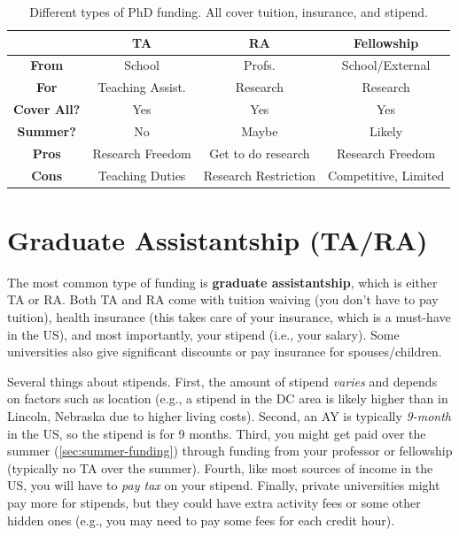 \documentclass[oneside,11pt]{book}
\begin{document}
\begin{table}
  \centering
  \small
  \caption{Different types of PhD funding. All cover tuition, insurance, and stipend.}\label{tab:funding}
  \begin{tabular}{c|c|c|c}
    \toprule
    &\textbf{TA}&\textbf{RA}&\textbf{Fellowship}\\
    \midrule
    \textbf{From} & School & Profs. & School/External\\
    \textbf{For}                  & Teaching Assist.       & Research                        & Research                              \\
    \textbf{Cover All?} & Yes                      & Yes                             & Yes                                   \\
    \textbf{Summer?}              & No                       & Maybe                           & Likely                                   \\
    \midrule
    \textbf{Pros}                 & Research Freedom         & Get to do research              & Research Freedom                      \\
    \textbf{Cons}                 & Teaching Duties           & Research Restriction & Competitive, Limited             \\
    \bottomrule
  \end{tabular}
\end{table}

\section{Graduate Assistantship (TA/RA)}\label{sec:ta-ra}
The most common type of funding is \textbf{graduate assistantship}, which is either TA or RA. Both TA and RA come with tuition waiving (you don't have to pay tuition), health insurance (this takes care of your insurance, which is a must-have in the US), and most importantly, your stipend (i.e., your salary). Some universities also give significant discounts or pay insurance for spouses/children.

Several things about stipends.  First, the amount of stipend \emph{varies} and depends on factors such as location (e.g., a stipend in the DC area is likely higher than in Lincoln, Nebraska due to higher living costs). Second, an \acrfull{AY}  is typically \emph{9-month} in the US, so the stipend is for 9 months. Third, you might get paid over the summer (\autoref{sec:summer-funding}) through funding from your professor or fellowship (typically no TA over the summer). Fourth, like most sources of income in the US, you will have to \emph{pay tax} on your stipend.  Finally, private universities might pay more for stipends, but they could have extra activity fees or some other hidden ones (e.g., you may need to pay some fees for each credit hour).
\end{document}

